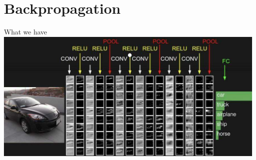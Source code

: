 \documentclass[serif, aspectratio=169]{beamer}
\begin{document}
	
	\section{Backpropagation}
	\begin{frame}{What we have}
		\centering
		\includegraphics[keepaspectratio, scale=0.7]{pic/car.png}
	\end{frame}
	
\end{document}
